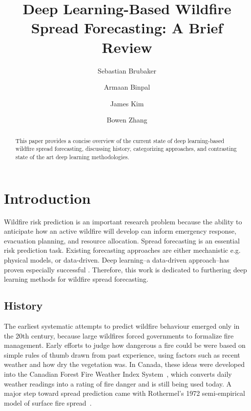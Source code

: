 \documentclass[sigconf]{acmart}
\begin{document}
\title{Deep Learning-Based Wildfire Spread Forecasting: A Brief Review}
\author{Sebastian Brubaker}

\author{Armaan Binpal}

\author{James Kim}

\author{Bowen Zhang}


\begin{abstract}
This paper provides a concise overview of the current state of deep learning-based wildfire spread forecasting, discussing history, categorizing approaches, and contrasting state of the art deep learning methodologies.    

\end{abstract}
\maketitle

\vspace{-1em}

\section{Introduction}
Wildfire risk prediction is an important research problem because the ability to anticipate how an active wildfire will develop can inform emergency response, evacuation planning, and resource allocation. Spread forecasting is an essential risk prediction task. Existing forecasting approaches are either mechanistic e.g. physical models, or data-driven. Deep learning--a data-driven approach--has proven especially successful \cite{XU2026BCWILDFIRE}. Therefore, this work is dedicated to furthering deep learning methods for wildfire spread forecasting.

\subsection{History}

The earliest systematic attempts to predict wildfire behaviour emerged only in the 20th century, because large wildfires forced governments to formalize fire management. Early efforts to judge how dangerous a fire could be were based on simple rules of thumb drawn from past experience, using factors such as recent weather and how dry the vegetation was. In Canada, these ideas were developed into the Canadian Forest Fire Weather Index System~\cite{VANWAGNER1987}, which converts daily weather readings into a rating of fire danger and is still being used today. A major step toward spread prediction came with Rothermel's 1972 semi-empirical model of surface fire spread~\cite{ROTHERMEL1972}.
\end{document}
